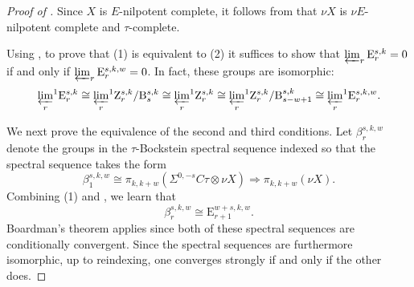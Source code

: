 \begin{proof}[Proof of ]
  Since $X$ is $E$-nilpotent complete, it follows from  that $\nu X$ is $\nu E$-nilpotent complete and $\tau$-complete.

  Using , to prove that (1) is equivalent to (2) it suffices to show that $\varprojlim_r \mathrm{E}^{s,k}_{r} = 0$ if and only if $\varprojlim_r \mathrm{E}^{s,k,w}_{r} = 0$. 
  In fact, these groups are isomorphic:
    \begin{align*}
      {\varprojlim_{r}}^1 \mathrm{E}^{s,k} _{r}
      \cong {\varprojlim_{r}}^1 \mathrm{Z}^{s,k}_{r}/\mathrm{B}_{s}^{s,k} 
      \cong {\varprojlim_{r}}^1 \mathrm{Z}^{s,k}_{r} 
      \cong {\varprojlim_{r}}^1 \mathrm{Z}^{s,k}_{r}/\mathrm{B}_{s-w+1}^{s,k} 
      \cong {\varprojlim_{r}}^1 \mathrm{E}^{s,k,w}_{r}.
    \end{align*}

We next prove the equivalence of the second and third conditions.  Let $\beta_r^{s,k,w}$ denote the groups in the $\tau$-Bockstein spectral sequence indexed so that the spectral sequence takes the form
    $$\beta_1^{s,k,w} \cong \pi_{k,k+w}(\Sigma^{0,-s} C\tau \otimes \nu X) \Longrightarrow \pi_{k,k+w} (\nu X).$$
Combining (1) and , we learn that
	$$\beta_r^{s,k,w} \cong \mathrm{E}_{r+1}^{w+s,k,w}.$$
Boardman's theorem applies since both of these spectral sequences are conditionally convergent.  Since the spectral sequences are furthermore isomorphic, up to reindexing, one converges strongly if and only if the other does.
\end{proof}

